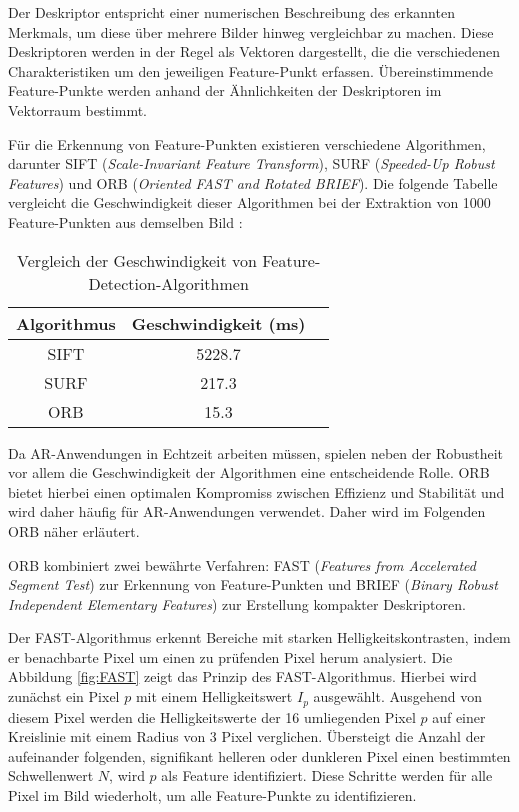 Der Deskriptor entspricht einer numerischen Beschreibung des erkannten Merkmals, um diese über mehrere Bilder hinweg vergleichbar zu machen. Diese Deskriptoren werden in der Regel als Vektoren dargestellt, die die verschiedenen Charakteristiken um den jeweiligen Feature-Punkt erfassen. Übereinstimmende Feature-Punkte werden anhand der Ähnlichkeiten der Deskriptoren im Vektorraum bestimmt. \cite{gao2021vSLAM, szeliski2022computerVision}

Für die Erkennung von Feature-Punkten existieren verschiedene Algorithmen, darunter SIFT (\emph{Scale-Invariant Feature Transform}), SURF (\emph{Speeded-Up Robust Features}) und ORB (\emph{Oriented FAST and Rotated BRIEF}). Die folgende Tabelle vergleicht die Geschwindigkeit dieser Algorithmen bei der Extraktion von 1000 Feature-Punkten aus demselben Bild \cite{gao2021vSLAM}:

\begin{table}[h]
    \centering
    \begin{tabular}{ccl} 
        \hline
        Algorithmus & Geschwindigkeit (ms) \\ 
        \hline
        SIFT & 5228.7 \\ 
        SURF & 217.3 \\ 
        ORB & 15.3 \\ 
        \hline
    \end{tabular}
    \caption{Vergleich der Geschwindigkeit von Feature-Detection-Algorithmen \cite{gao2021vSLAM}}
    \label{tab:AlgorithmComparison}
\end{table}

Da AR-Anwendungen in Echtzeit arbeiten müssen, spielen neben der Robustheit vor allem die Geschwindigkeit der Algorithmen eine entscheidende Rolle. ORB bietet hierbei einen optimalen Kompromiss zwischen Effizienz und Stabilität und wird daher häufig für AR-Anwendungen verwendet. Daher wird im Folgenden ORB näher erläutert. \cite{gao2021vSLAM, rublee2011orb}

ORB kombiniert zwei bewährte Verfahren: FAST (\emph{Features from Accelerated Segment Test}) zur Erkennung von Feature-Punkten und BRIEF (\emph{Binary Robust Independent Elementary Features}) zur Erstellung kompakter Deskriptoren. \cite{gao2021vSLAM, rublee2011orb}

Der FAST-Algorithmus erkennt Bereiche mit starken Helligkeitskontrasten, indem er benachbarte Pixel um einen zu prüfenden Pixel herum analysiert. Die Abbildung \ref{fig:FAST} zeigt das Prinzip des FAST-Algorithmus. Hierbei wird zunächst ein Pixel \( p \) mit einem Helligkeitswert \( I_p \) ausgewählt. Ausgehend von diesem Pixel werden die Helligkeitswerte der 16 umliegenden Pixel \( p \) auf einer Kreislinie mit einem Radius von 3 Pixel verglichen. Übersteigt die Anzahl der aufeinander folgenden, signifikant helleren oder dunkleren Pixel einen bestimmten Schwellenwert \( N \), wird \( p \) als Feature identifiziert. Diese Schritte werden für alle Pixel im Bild wiederholt, um alle Feature-Punkte zu identifizieren. 

